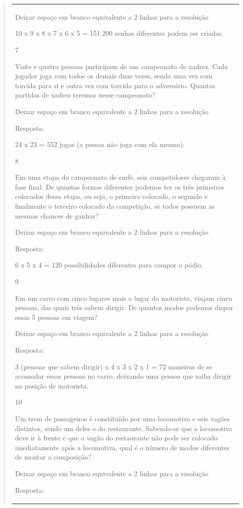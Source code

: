 \begin{mdframed}[linewidth=2pt,linecolor=salmao,roundcorner=2pt]
\begin{itemize}
{\begin{itemize}
\begin{escolha}
{\begin{quote}
{\begin{escolha}
{{{{{\begin{longtable}[]{@{}l@{}}
\begin{itemize}
{Deixar espaço em branco equivalente a 2 linhas para a resolução

10 x 9 x 8 x 7 x 6 x 5 = 151.200 senhas diferentes podem ser criadas.

\num{7}

Vinte e quatro pessoas participam de um campeonato de xadrez. Cada jogador joga com todos os demais duas vezes, sendo uma vez com
torcida para si e outra vez com torcida para o adversário. Quantas partidas
de xadrez teremos nesse campeonato?

Deixar espaço em branco equivalente a 2 linhas para a resolução

Resposta:

24 x 23 = 552 jogos (a pessoa não joga com ela mesma).

\num{8}

Em uma etapa do campeonato de surfe, seis competidores chegaram à fase
final. De quantas formas diferentes podemos ter os três primeiros
colocados dessa etapa, ou seja, o primeiro colocado, o segundo e
finalmente o terceiro colocado da competição, se todos
possuem as mesmas chances de ganhar?

Deixar espaço em branco equivalente a 2 linhas para a resolução

Resposta:

6 x 5 x 4 = 120 possibilidades diferentes para compor o pódio.

\num{9}

Em um carro com cinco lugares mais o lugar do motorista, viajam cinco pessoas,
das quais três sabem dirigir. De quantos modos podemos dispor essas 5
pessoas em viagem?

Deixar espaço em branco equivalente a 2 linhas para a resolução

Resposta:

3 (pessoas que sabem dirigir) x 4 x 3 x 2 x 1 = 72 maneiras de se
acomodar essas pessoas no carro, deixando uma pessoa que saiba dirigir
na posição de motorista.

\num{10}

Um trem de passageiros é constituído por uma locomotiva e seis vagões
distintos, sendo um deles o do restaurante. Sabendo-se que a locomotiva deve ir
à frente e que o vagão do restaurante não pode ser colocado imediatamente
após a locomotiva, qual é o número de modos diferentes de montar a
composição?

Deixar espaço em branco equivalente a 2 linhas para a resolução

Resposta:

}
\end{itemize}
\end{longtable}}}}}}
\end{escolha}}
\end{quote}}
\end{escolha}
\end{itemize}}
\end{itemize}
\end{mdframed}
